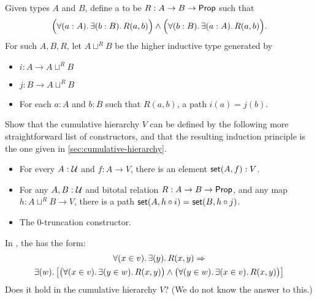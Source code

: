 \begin{ex}\label{ex:cumhierhit}
  Given types $A$ and $B$, define a  to be $R:A\to B\to \mathsf{Prop}$ such that
  \[ \Big(\fall{a:A}\exis{b:B} R(a,b) \Big) \land \Big(\fall{b:B}\exis{a:A} R(a,b) \Big). \]
  For such $A,B,R$, let $A\sqcup^R B$ be the higher inductive type generated by
  \begin{itemize}
  \item $i:A\to A\sqcup^R B$
  \item $j:B\to A\sqcup^R B$
  \item For each $a:A$ and $b:B$ such that $R(a,b)$, a path $i(a)=j(b)$.
  \end{itemize}
  Show that the cumulative hierarchy $V$ can be defined by the following more straightforward list of constructors, and that the resulting induction principle is the one given in \autoref{sec:cumulative-hierarchy}.
  \begin{itemize}
  \item For every $A : \mathcal{U}$ and $f : A \to V$, there is an element $\mathsf{set}(A, f) : V$.
  \item For any $A,B:\mathcal{U}$ and bitotal relation $R:A\to B\to \mathsf{Prop}$, and any map $h:A\sqcup^R B \to V$, there is a path $\mathsf{set}(A,h\circ i) =_{} \mathsf{set}(B,h\circ j)$.
  \item The 0-truncation constructor.
  \end{itemize}
\end{ex}

\begin{ex}
   In \CZF, the  has the form:
   \begin{multline*}
   \fall{x\in v}\exis{y} R(x,y) \Rightarrow \\
   \exis{w}\big[\big(\fall{x\in v}\exis{y\in w}R(x,y)\big)\land \big(\fall{y\in w}\exis{x\in v}R(x,y) \big)\big]
   \end{multline*}
   Does it hold in the cumulative hierarchy $V$?  (We do not know the answer to this.)
\end{ex}

